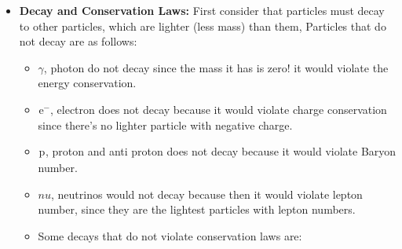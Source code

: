 \documentclass[10pt,a4paper]{article}
\newcommand{\ch}[5]{{}^{#2}_{#3}\!\text{#1}^{#4}_{#5}}
\newcommand{\electron}{\ch{e}{}{}{-}{}}
\newcommand{\proton}{\ch{p}{}{}{}{}}
\begin{document}
\begin{itemize}
               \item \textbf{Decay and Conservation Laws: } First consider that particles must decay to other particles, which are lighter (less mass) than them, Particles that do not decay are as follows:
               \begin{itemize}
                    \item $\gamma$, photon do not decay since the mass it has is zero! it would violate the energy conservation.
                    \item $\electron$, electron does not decay because it would violate charge conservation since there's no lighter particle with negative charge.
                    \item $\proton$, proton and anti proton does not decay because it would violate Baryon number.
                    \item $nu$, neutrinos would not decay because then it would violate lepton number, since they are the lightest particles with lepton numbers.
                    \item Some decays that do not violate conservation laws are:


\end{itemize}
\end{itemize}
\end{document}

